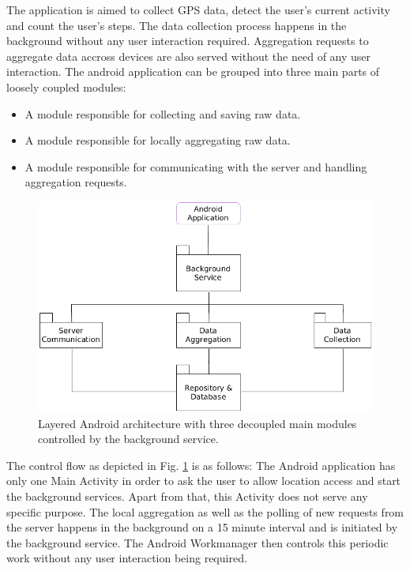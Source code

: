 \begin{samepage}
The application is aimed to collect GPS data, detect the user's current activity and count the user's steps. The data collection process happens in the background without any user interaction required. Aggregation requests to aggregate data accross devices are also served without the need of any user interaction.
The android application can be grouped into three main parts of loosely coupled modules:
\begin{itemize}
	\item A module responsible for collecting and saving raw data.
	\item A module responsible for locally aggregating raw data.
	\item A module responsible for communicating with the server and handling aggregation requests.
\end{itemize}
\end{samepage}

\begin{figure}[h!]
  \includegraphics[width=\textwidth]{data/diagrams/android-architecture.png}
  \caption{Layered Android architecture with three decoupled main modules controlled by the background service.}
  \label{android-overview}
\end{figure}

The control flow as depicted in Fig. \ref{android-overview} is as follows: 
The Android application has only one Main Activity in order to ask the user to allow location access and start the background services. Apart from that, this Activity does not serve any specific purpose. 
The local aggregation as well as the polling of new requests from the server happens in the background on a 15 minute interval and is initiated by the background service. The Android Workmanager then controls this periodic work without any user interaction being required.

